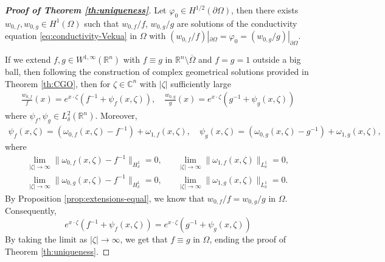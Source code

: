 \documentclass[12pt]{article}
\def\R{\mathbb{R}}
\begin{document}
\begin{proof}[\textbf{Proof of Theorem \ref{th:uniqueness}}]
Let $\varphi_0\in H^{1/2}(\partial\Omega)$, then there exists $w_{0,f}, w_{0,g}\in H^1(\Omega)$ such that $w_{0,f}/f$, $w_{0,g}/g$ are solutions of the conductivity equation \eqref{eq:conductivity-Vekua} in $\Omega$ with $(w_{0,f}/f)|_{\partial\Omega}=\varphi_0=(w_{0,g}/g)|_{\partial\Omega}$. 

If we extend $f,g\in W^{1,\infty}(\mathbb{R}^n)$ with $f\equiv g$ in $\R^n\setminus \overline{\Omega}$ and $f=g=1$ outside a big ball, then following the construction of complex geometrical solutions provided in Theorem \ref{th:CGO}, then for $\zeta\in \mathbb{C}^n$ with $|\zeta|$ sufficiently large
\begin{align}\label{eq:CGO}
\frac{w_{0,f}}{f}(x)=e^{x\cdot\zeta}\left(f^{-1}+\psi_f(x,\zeta)\right), \quad \frac{w_{0,g}}{g}(x)=e^{x\cdot\zeta}\left(g^{-1}+\psi_g(x,\zeta)\right)
\end{align}
where $\psi_{f}, \psi_{g}\in L^2_{\delta}(\mathbb{R}^n)$.
Moreover, 
\begin{align*}
\psi_{f}(x,\zeta)=\left(\omega_{0,f}(x,\zeta)-f^{-1}\right)+\omega_{1,f}(x,\zeta), \quad \psi_{g}(x,\zeta)=\left(\omega_{0,g}(x,\zeta)-g^{-1}\right)+\omega_{1,g}(x,\zeta),
\end{align*}
where
\begin{align*}
\lim_{|\zeta|\rightarrow \infty} \|\omega_{0,f}(x,\zeta)-f^{-1}\|_{H_{\delta}^1}=0, &\quad \lim_{|\zeta|\rightarrow \infty} \|\omega_{1,f}(x,\zeta)\|_{L_{\delta}^1}=0,\\
\lim_{|\zeta|\rightarrow \infty} \|\omega_{0,g}(x,\zeta)-f^{-1}\|_{H_{\delta}^1}=0, &\quad \lim_{|\zeta|\rightarrow \infty} \|\omega_{1,g}(x,\zeta)\|_{L_{\delta}^1}=0. 
\end{align*}
By Proposition \ref{prop:extensions-equal}, we know that $w_{0,f}/f=w_{0,g}/g$ in $\Omega$. Consequently,
\begin{equation*}
    e^{x\cdot\zeta}\left(f^{-1}+\psi_f(x,\zeta)\right)=e^{x\cdot\zeta}\left(g^{-1}+\psi_g(x,\zeta)\right)
\end{equation*}
By taking the limit as $|\zeta|\rightarrow \infty$, we get that $f\equiv g$ in $\Omega$, ending the proof of Theorem \ref{th:uniqueness}.
\end{proof}

\end{document}
